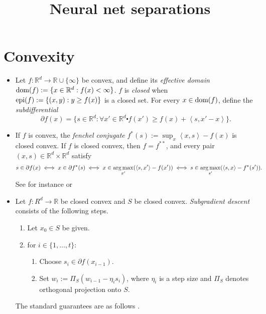 \documentclass{article}
\title{Neural net separations}
\author{}
\date{}
\def\R{\mathbb R}
\def\epi{\textup{epi}}
\def\dom{\textup{dom}}
\newcommand{\ip}[2]{\left\langle #1, #2 \right \rangle}
\newcommand{\argmax}{\operatornamewithlimits{arg\,max}}
\begin{document}
\section{Convexity}

\begin{itemize}
  \item
    Let $f : \R^d\to\R\cup \{\infty\}$ be convex, and define its \emph{effective domain}
    $\dom(f) := \{x \in\R^d : f(x) < \infty\}$.
    $f$ is \emph{closed} when $\epi(f) := \{ (x,y) : y\geq f(x)\}$
    is a closed set.
    For every $x\in\dom(f)$, define the \emph{subdifferential}
    \[
      \partial f(x) = \{s\in\R^d : \forall x'\in\R^d\centerdot f(x') \geq f(x) + \ip{s}{x'-x}\}.
    \]

  \item
    If $f$ is convex, the \emph{fenchel conjugate} $f^*(s) := \sup_x \ip{x}{s} - f(x)$ is closed convex.
    If $f$ is closed convex, then $f=f^{**}$, and
    every pair $(x,s) \in \R^d\times\R^d$ satisfy
    \begin{align*}
    s \in \partial f(x)
      &\iff
      x \in \partial f^*(s)
      \iff
      x \in \argmax_{x'} ( \ip{s}{x'} - f(x') )
      \iff
      s \in \argmax_{s'} ( \ip{s}{x} - f^*(s') ).
    \end{align*}
    See for instance
    \citep[Theorem 23.5]{ROC}
    or \citep[Corollary E.1.4.4]{HULL}

  \item
    Let $f :R^d \to \R$ be closed convex and $S$ be closed convex.  \emph{Subgradient descent} consists
    of the following steps.
    \begin{enumerate}
      \item
        Let $x_0 \in S$ be given.
      \item
        for $i\in \{1,\ldots,t\}$:

        \begin{enumerate}
          \item
            Choose $s_i \in \partial f(x_{i-1})$.
          \item
            Set $w_i := \Pi_S(w_{i-1} - \eta_i s_i)$, where $\eta_i$ is a step size and
            $\Pi_S$ denotes orthogonal projection onto $S$.
        \end{enumerate}
    \end{enumerate}
    The standard guarantees are as follows \citep[Chapter 3]{bubeck}.


\end{itemize}
\end{document}
